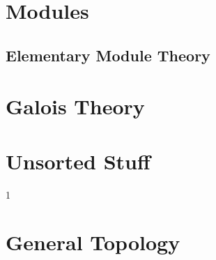 \documentclass{book}                                                           %
\def\compiletopology{0}
\begin{document}
            \part{Modules}
                \renewcommand{\PARPATH}{\TOPPATH/Algebra/Modules}
                \chapter{Elementary  Module Theory}
                    \renewcommand{\PATH}{\PARPATH/Elementary_Properties}
                    \label{chapt:Elementary_Module_Theory}%
                    
            \part{Galois Theory}
                \renewcommand{\PARPATH}{\TOPPATH/Algebra/Galois_Theory}
                
            \part{Unsorted Stuff}
                
                
                
                
                
                
        \clearpage
        \setcounter{endpage}{\thepage}
    \fi

    \if\compiletopology1
            \label{book:Topology}%
            \renewcommand{\PATH}{\TOPPATH/Topology}
            \setcounter{page}{\value{endpage}}
            \part{General Topology}
                \renewcommand{\PARPATH}{\TOPPATH/Topology/General_Topology}
\end{document}
